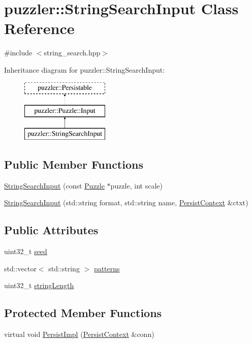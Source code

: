 \hypertarget{a00032}{}\section{puzzler\+:\+:String\+Search\+Input Class Reference}
\label{a00032}


{\ttfamily \#include $<$string\+\_\+search.\+hpp$>$}

Inheritance diagram for puzzler\+:\+:String\+Search\+Input\+:\begin{figure}[H]
\begin{center}
\leavevmode
\includegraphics[height=3.000000cm]{a00032}
\end{center}
\end{figure}
\subsection*{Public Member Functions}
\begin{DoxyCompactItemize}
\item 
\hyperlink{a00032_abad7be8f8bd06fd64bf2889d079c9e0c}{String\+Search\+Input} (const \hyperlink{a00026}{Puzzle} $\ast$puzzle, int scale)
\item 
\hyperlink{a00032_aa98136ecc997d30011b1165a0e7d3b1e}{String\+Search\+Input} (std\+::string format, std\+::string name, \hyperlink{a00025}{Persist\+Context} \&ctxt)
\end{DoxyCompactItemize}
\subsection*{Public Attributes}
\begin{DoxyCompactItemize}
\item 
uint32\+\_\+t \hyperlink{a00032_a1b0f189a01feb433ed423e651909c74c}{seed}
\item 
std\+::vector$<$ std\+::string $>$ \hyperlink{a00032_a7700992dfb5b68c72c7831636313f0b8}{patterns}
\item 
uint32\+\_\+t \hyperlink{a00032_a2bfd9b352187289998bc50e9511cc227}{string\+Length}
\end{DoxyCompactItemize}
\subsection*{Protected Member Functions}
\begin{DoxyCompactItemize}
\item 
virtual void \hyperlink{a00032_aaf3078cb090dea965efbf7df66f2338f}{Persist\+Impl} (\hyperlink{a00025}{Persist\+Context} \&conn)
\end{DoxyCompactItemize}


